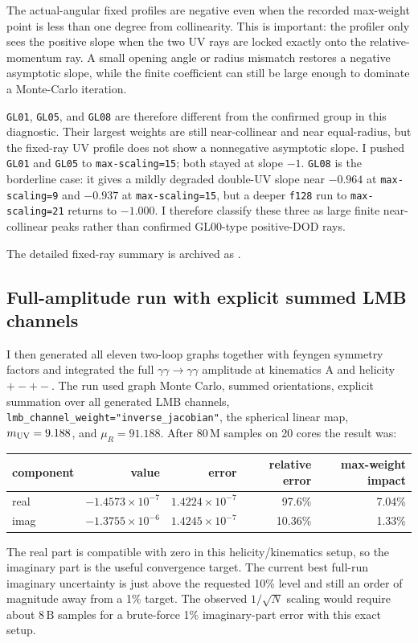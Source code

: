\documentclass[11pt]{article}
\begin{document}
The actual-angular fixed profiles are negative even when the recorded
max-weight point is less than one degree from collinearity.  This is important:
the profiler only sees the positive slope when the two UV rays are locked
exactly onto the relative-momentum ray.  A small opening angle or radius
mismatch restores a negative asymptotic slope, while the finite coefficient can
still be large enough to dominate a Monte-Carlo iteration.

\texttt{GL01}, \texttt{GL05}, and \texttt{GL08} are therefore different from
the confirmed group in this diagnostic.  Their largest weights are still
near-collinear and near equal-radius, but the fixed-ray UV profile does not
show a nonnegative asymptotic slope.  I pushed \texttt{GL01} and \texttt{GL05}
to \texttt{max-scaling=15}; both stayed at slope $-1$.  \texttt{GL08} is the
borderline case: it gives a mildly degraded double-UV slope near $-0.964$ at
\texttt{max-scaling=9} and $-0.937$ at \texttt{max-scaling=15}, but a deeper
\texttt{f128} run to \texttt{max-scaling=21} returns to $-1.000$.  I therefore
classify these three as large finite near-collinear peaks rather than confirmed
GL00-type positive-DOD rays.

The detailed fixed-ray summary is archived as
.

\subsection{Full-amplitude run with explicit summed LMB channels}
\label{subsec:full-amplitude-summed-lmb}

I then generated all eleven two-loop graphs together with feyngen symmetry
factors and integrated the full \(\gamma\gamma\to\gamma\gamma\) amplitude at
kinematics A and helicity \(+-+-\).  The run used graph Monte Carlo, summed
orientations, explicit summation over all generated LMB channels,
\texttt{lmb\_channel\_weight="inverse\_jacobian"}, the spherical linear map,
\(m_{\rm UV}=9.188\), and \(\mu_R=91.188\).  After
\(80\,\mathrm{M}\) samples on 20 cores the result was:
\begin{center}
\scriptsize
\begin{tabular}{lrrrr}
\toprule
component & value & error & relative error & max-weight impact\\
\midrule
real & $-1.4573\times 10^{-7}$ & $1.4224\times 10^{-7}$ &
97.6\% & 7.04\%\\
imag & $-1.3755\times 10^{-6}$ & $1.4245\times 10^{-7}$ &
10.36\% & 1.33\%\\
\bottomrule
\end{tabular}
\end{center}
The real part is compatible with zero in this helicity/kinematics setup, so the
imaginary part is the useful convergence target.  The current best full-run
imaginary uncertainty is just above the requested 10\% level and still an order
of magnitude away from a 1\% target.  The observed \(1/\sqrt{N}\) scaling would
require about \(8\,\mathrm{B}\) samples for a brute-force 1\% imaginary-part
error with this exact setup.
\end{document}
